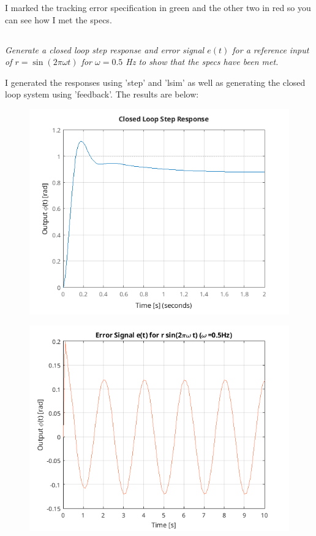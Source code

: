 \documentclass{article}
\begin{document}
I marked the tracking error specification in green and the other two in red so you can see how I met the specs.

\subsection{}

\textit{Generate a closed loop step response and error signal $e(t)$ for a reference input of $r = \sin(2\pi\omega t)$ for $\omega = 0.5$ Hz to show that the specs have been met.}

I generated the responses using 'step' and 'lsim' as well as generating the closed loop system using 'feedback'.
The results are below:

\begin{figure}[H]
    \centering
    \includegraphics[width=\textwidth]{d4clStep.png}
\end{figure}

\begin{figure}[H]
    \centering
    \includegraphics[width=\textwidth]{d4clSinError.png}
\end{figure}
\end{document}
